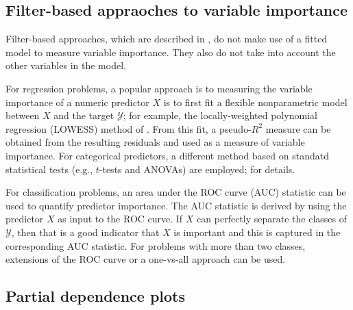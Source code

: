 \documentclass[12pt]{article}
\begin{document}
\subsection{Filter-based appraoches to variable importance}

Filter-based approaches, which are described in \citet[chap. 18]{applied-kuhn-2013}, do not make use of a fitted model to measure variable importance. They also do not take into account the other variables in the model.

For regression problems, a popular approach is to measuring the variable importance of a numeric predictor $X$ is to first fit a flexible nonparametric model between $X$ and the target $\mathcal{Y}$; for example, the locally-weighted polynomial regression (LOWESS) method of \citet{robust-cleveland-1979}. From this fit, a pseudo-$R^2$ measure can be obtained from the resulting residuals and used as a measure of variable importance. For categorical predictors, a different method based on standatd statistical tests (e.g., $t$-tests and ANOVAs) are employed; \citet[chap. 18]{applied-kuhn-2013} for details.

For classification problems, an area under the ROC curve (AUC) statistic can be used to quantify predictor importance. The AUC statistic is derived by using the predictor $X$ as input to the ROC curve. If $X$ can perfectly separate the classes of $\mathcal{Y}$, then that is a good indicator that $X$ is important and this is captured in the corresponding AUC statistic. For problems with more than two classes, extensions of the ROC curve or a one-vs-all approach can be used.


\subsection{Partial dependence plots}
\end{document}
